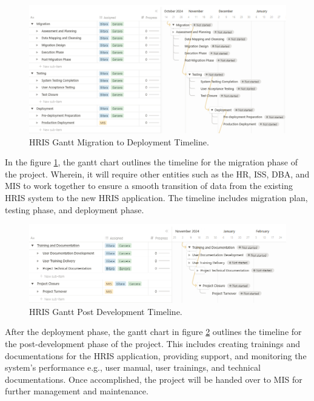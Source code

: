     \begin{figure}[H]
        \centering
        \includegraphics[width=1\linewidth]{figures/images/gantt-chart-3.png}
        \caption{HRIS Gantt Migration to Deployment Timeline.}
        \label{fig:gantt-chart-3}
    \end{figure}

    In the figure \ref{fig:gantt-chart-3}, the gantt chart outlines the timeline for the migration phase of the project. Wherein, it will require other entities such as the HR, ISS, DBA, and MIS to work together to ensure a smooth transition of data from the existing HRIS system to the new HRIS application. The timeline includes migration plan, testing phase, and deployment phase.

    \begin{figure}[H]
        \centering
        \includegraphics[width=1\linewidth]{figures/images/gantt-chart-4.png}
        \caption{HRIS Gantt Post Development Timeline.}
        \label{fig:gantt-chart-4}
    \end{figure}

    After the deployment phase, the gantt chart in figure \ref{fig:gantt-chart-4} outlines the timeline for the post-development phase of the project. This includes creating trainings and documentations for the HRIS application, providing support, and monitoring the system's performance e.g., user manual, user trainings, and technical documentations. Once accomplished, the project will be handed over to MIS for further management and maintenance.

